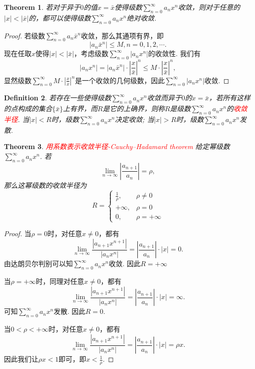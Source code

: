 \documentclass{article}
\newtheorem{theorem}{Theorem}[section]
\newtheorem{definition}[theorem]{Definition}
\newcommand{\redt}[1]{\textcolor{red}{#1}}
\begin{document}
\begin{theorem}
\rm 若对于异于$0$的值$x=\bar{x}$使得级数$\sum\limits_{n=0}^{\infty}a_nx^n$收敛，则对于任意的$|x| < |\bar{x}|$的，都可以使得级数$\sum\limits_{n=0}^{\infty}a_nx^n$绝对收敛.
\end{theorem}

\begin{proof}
若级数$\sum\limits_{n=0}^{\infty}a_n\bar{x}^n$收敛，那么其通项有界，即
$$
|a_n\bar{x}^n| \leq M, n = 0,1,2,\cdots.
$$
现在任取$x$使得$|x| < |\bar{x}|$，考虑级数$\sum\limits_{n=0}^{\infty}|a_nx^n|$的收敛性. 我们有
$$
|a_nx^n| = |a_n\bar{x}^n|\cdot \left|\frac{x}{\bar{x}}\right|^n \leq M\cdot\left|\frac{x}{\bar{x}}\right|^n,
$$
显然级数$\sum\limits_{n=0}^{\infty} M\cdot\left|\frac{x}{\bar{x}}\right|^n$是一个收敛的几何级数，因此$\sum\limits_{n=0}^{\infty}|a_nx^n|$收敛. 
\end{proof}


\begin{definition}
\rm 若存在一些使得级数$\sum\limits_{n=0}^{\infty}a_nx^n$收敛而异于$0$的$x = \bar{x}$，若所有这样的点构成的集合$\{\bar{x}\}$上有界，而$R$是它的上确界，则称$R$是级数$\sum\limits_{n=0}^{\infty}a_nx^n$的\redt{收敛半径}. 当$|x| < R$时，级数$\sum\limits_{n=0}^{\infty}a_nx^n$决定收敛; 当$|x| > R$时，级数$\sum\limits_{n=0}^{\infty}a_nx^n$发散. 
\end{definition}

\begin{theorem}
\rm \redt{用系数表示收敛半径-Cauchy–Hadamard theorem
} 给定幂级数$\sum\limits_{n=0}^{\infty}a_nx^n$. 若
$$
\lim\limits_{n \to \infty} \left|\frac{a_{n+1}}{a_n}\right| = \rho,
$$
那么这幂级数的收敛半径为
$$
R = \left\{ \begin{array}{ll}
\frac{1}{\rho}, & \rho \neq 0 \\
+\infty, & \rho = 0 \\
0, & \rho = +\infty
\end{array}\right.
$$
\end{theorem}

\begin{proof}
\rm 当$\rho=0$时，对任意$x \neq 0$，都有
$$
\lim\limits_{n \to \infty}\frac{|a_{n+1}x^{n+1}|}{|a_{n}x^n|} = \left|\frac{a_{n+1}}{a_n}\right|\cdot |x| = 0.
$$
由达朗贝尔判别可以知$\sum\limits_{n=0}^{\infty}a_nx^n$收敛. 因此$R = +\infty$ 

当$\rho = +\infty$时，同理对任意$x \neq 0$，都有
$$
\lim\limits_{n \to \infty}\frac{|a_{n+1}x^{n+1}|}{|a_{n}x^n|} = \left|\frac{a_{n+1}}{a_n}\right|\cdot |x| = \infty.
$$
可知$\sum\limits_{n=0}^{\infty}a_nx^n$发散. 因此$R = 0$.

当$0 < \rho < +\infty$时，对任意$x \neq 0$，都有
$$
\lim\limits_{n \to \infty}\frac{|a_{n+1}x^{n+1}|}{|a_{n}x^n|} = \left|\frac{a_{n+1}}{a_n}\right|\cdot|x|  = \rho x.
$$
因此我们让$\rho x < 1$即可，即$x < \frac{1}{\rho}$. 
\end{proof}
\end{document}
